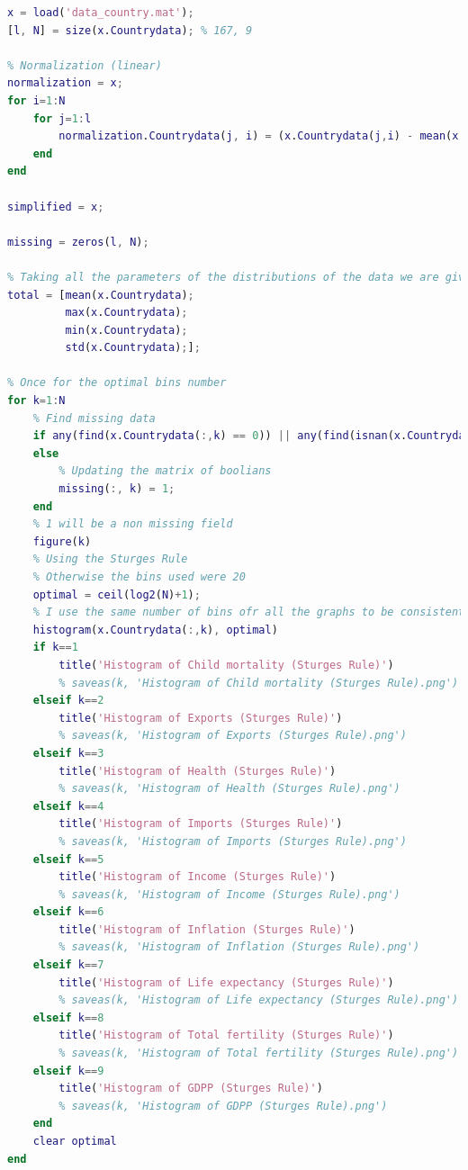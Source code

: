 \documentclass[12pt, a4paper]{article}
\begin{document}
\begin{lstlisting}[language=Matlab, label=lst:final, caption=The entire code as it was upon completion.]
x = load('data_country.mat');
[l, N] = size(x.Countrydata); % 167, 9

% Normalization (linear)
normalization = x;
for i=1:N
    for j=1:l
        normalization.Countrydata(j, i) = (x.Countrydata(j,i) - mean(x.Countrydata(:,i)))/(std(x.Countrydata(:, i)));
    end
end

simplified = x;

missing = zeros(l, N);

% Taking all the parameters of the distributions of the data we are given
total = [mean(x.Countrydata);
         max(x.Countrydata);
         min(x.Countrydata);
         std(x.Countrydata);];

% Once for the optimal bins number
for k=1:N
    % Find missing data
    if any(find(x.Countrydata(:,k) == 0)) || any(find(isnan(x.Countrydata(:,k)))) || any(find(x.Countrydata(:,k) == missing))
    else
        % Updating the matrix of boolians
        missing(:, k) = 1;
    end
    % 1 will be a non missing field
    figure(k)
    % Using the Sturges Rule
    % Otherwise the bins used were 20
    optimal = ceil(log2(N)+1);
    % I use the same number of bins ofr all the graphs to be consistent
    histogram(x.Countrydata(:,k), optimal)
    if k==1
        title('Histogram of Child mortality (Sturges Rule)')
        % saveas(k, 'Histogram of Child mortality (Sturges Rule).png')
    elseif k==2
        title('Histogram of Exports (Sturges Rule)') 
        % saveas(k, 'Histogram of Exports (Sturges Rule).png')
    elseif k==3
        title('Histogram of Health (Sturges Rule)')
        % saveas(k, 'Histogram of Health (Sturges Rule).png')
    elseif k==4
        title('Histogram of Imports (Sturges Rule)')
        % saveas(k, 'Histogram of Imports (Sturges Rule).png')
    elseif k==5 
        title('Histogram of Income (Sturges Rule)')
        % saveas(k, 'Histogram of Income (Sturges Rule).png')
    elseif k==6
        title('Histogram of Inflation (Sturges Rule)')
        % saveas(k, 'Histogram of Inflation (Sturges Rule).png')
    elseif k==7
        title('Histogram of Life expectancy (Sturges Rule)')
        % saveas(k, 'Histogram of Life expectancy (Sturges Rule).png')
    elseif k==8
        title('Histogram of Total fertility (Sturges Rule)')
        % saveas(k, 'Histogram of Total fertility (Sturges Rule).png')
    elseif k==9
        title('Histogram of GDPP (Sturges Rule)')
        % saveas(k, 'Histogram of GDPP (Sturges Rule).png')
    end
    clear optimal
end


\end{lstlisting}
\end{document}
